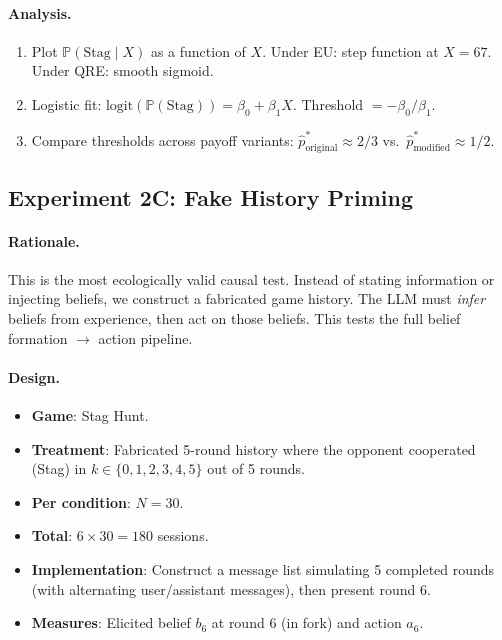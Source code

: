 \documentclass[12pt]{article}
\newcommand{\Prob}{\mathbb{P}}
\begin{document}
\paragraph{Analysis.}
\begin{enumerate}[nosep]
    \item Plot $\Prob(\text{Stag} \mid X)$ as a function of $X$. Under EU: step function at $X = 67$. Under QRE: smooth sigmoid.
    \item Logistic fit: $\text{logit}(\Prob(\text{Stag})) = \beta_0 + \beta_1 X$. Threshold $= -\beta_0 / \beta_1$.
    \item Compare thresholds across payoff variants: $\hat{p}^*_{\text{original}} \approx 2/3$ vs.\ $\hat{p}^*_{\text{modified}} \approx 1/2$.
\end{enumerate}


\subsection{Experiment 2C: Fake History Priming}
\label{sec:exp2c}

\paragraph{Rationale.}
This is the most ecologically valid causal test. Instead of stating information or injecting beliefs, we construct a fabricated game history. The LLM must \emph{infer} beliefs from experience, then act on those beliefs. This tests the full belief formation $\to$ action pipeline.

\paragraph{Design.}
\begin{itemize}[nosep]
    \item \textbf{Game}: Stag Hunt.
    \item \textbf{Treatment}: Fabricated 5-round history where the opponent cooperated (Stag) in $k \in \{0, 1, 2, 3, 4, 5\}$ out of 5 rounds.
    \item \textbf{Per condition}: $N = 30$.
    \item \textbf{Total}: $6 \times 30 = 180$ sessions.
    \item \textbf{Implementation}: Construct a message list simulating 5 completed rounds (with alternating user/assistant messages), then present round 6.
    \item \textbf{Measures}: Elicited belief $b_6$ at round 6 (in fork) and action $a_6$.
\end{itemize}
\end{document}

